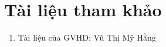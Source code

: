 \documentclass[oneside,a4paper,14pt]{extreport}
\begin{document}

\setcounter{page}{1}


\tableofcontents

 
\clearpage








%

\chapter*{Tài liệu tham khảo}

\begin{enumerate}
    \item Tài liệu của GVHD: Vũ Thị Mỹ Hằng
\end{enumerate}



%
%
\end{document}
